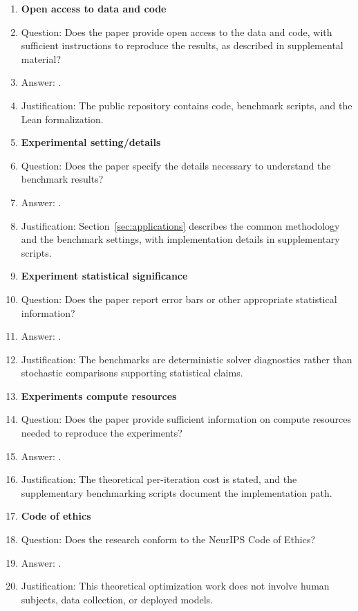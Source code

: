 \documentclass{article}
\theoremstyle{plain}
\begin{document}
\begin{enumerate}
\item {\bf Open access to data and code}
\item[] Question: Does the paper provide open access to the data and code, with sufficient instructions to reproduce the results, as described in supplemental material?
\item[] Answer: \answerYes{}.
\item[] Justification: The public repository contains code, benchmark scripts, and the Lean formalization.

\item {\bf Experimental setting/details}
\item[] Question: Does the paper specify the details necessary to understand the benchmark results?
\item[] Answer: \answerYes{}.
\item[] Justification: Section~\ref{sec:applications} describes the common methodology and the benchmark settings, with implementation details in supplementary scripts.

\item {\bf Experiment statistical significance}
\item[] Question: Does the paper report error bars or other appropriate statistical information?
\item[] Answer: \answerNA{}.
\item[] Justification: The benchmarks are deterministic solver diagnostics rather than stochastic comparisons supporting statistical claims.

\item {\bf Experiments compute resources}
\item[] Question: Does the paper provide sufficient information on compute resources needed to reproduce the experiments?
\item[] Answer: \answerYes{}.
\item[] Justification: The theoretical per-iteration cost is stated, and the supplementary benchmarking scripts document the implementation path.

\item {\bf Code of ethics}
\item[] Question: Does the research conform to the NeurIPS Code of Ethics?
\item[] Answer: \answerYes{}.
\item[] Justification: This theoretical optimization work does not involve human subjects, data collection, or deployed models.


\end{enumerate}
\end{document}
